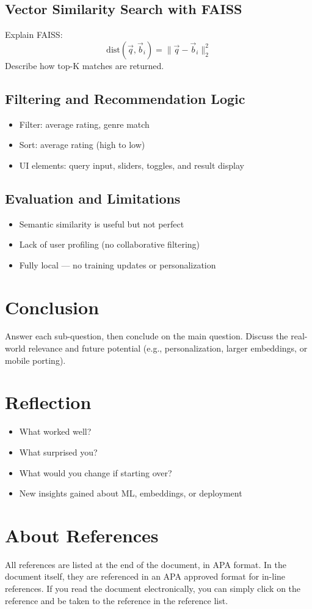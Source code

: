 \subsection{Vector Similarity Search with FAISS}
Explain FAISS:
\[
\text{dist}(\vec{q}, \vec{b}_i) = \|\vec{q} - \vec{b}_i\|_2^2
\]
Describe how top-K matches are returned.

\subsection{Filtering and Recommendation Logic}
\begin{itemize}
  \item Filter: average rating, genre match
  \item Sort: average rating (high to low)
  \item UI elements: query input, sliders, toggles, and result display
\end{itemize}

\subsection{Evaluation and Limitations}
\begin{itemize}
  \item Semantic similarity is useful but not perfect
  \item Lack of user profiling (no collaborative filtering)
  \item Fully local — no training updates or personalization
\end{itemize}

\section{Conclusion}
Answer each sub-question, then conclude on the main question.
Discuss the real-world relevance and future potential (e.g., personalization, larger embeddings, or mobile porting).

\section{Reflection}
\begin{itemize}
  \item What worked well?
  \item What surprised you?
  \item What would you change if starting over?
  \item New insights gained about ML, embeddings, or deployment
\end{itemize}

\section{About References}
\label{sec:aboutreferences}
All references are listed at the end of the document, in APA format. In the document itself, they are referenced in an APA approved format for in-line references. 
If you read the document electronically, you can simply click on the reference and be taken to the reference in the reference list.